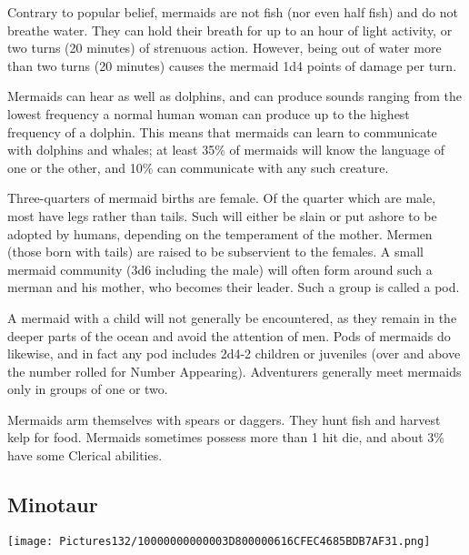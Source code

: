 \documentclass[a4paper,twoside,openany,10pt]{book}
\begin{document}
\begin{multicols}{2}
Contrary to popular belief, mermaids are not fish (nor even half fish) and do not breathe water. They can hold their breath for up to an hour of light activity, or two turns (20 minutes) of strenuous action. However, being out of water more than two turns (20 minutes) causes the mermaid 1d4 points of damage per turn.

Mermaids can hear as well as dolphins, and can produce sounds ranging from the lowest frequency a normal human woman can produce up to the highest frequency of a dolphin. This means that mermaids can learn to communicate with dolphins and whales; at least 35\% of mermaids will know the language of one or the other, and 10\% can communicate with any such creature.

Three-quarters of mermaid births are female. Of the quarter which are male, most have legs rather than tails. Such will either be slain or put ashore to be adopted by humans, depending on the temperament of the mother. Mermen (those born with tails) are raised to be subservient to the females. A small mermaid community (3d6 including the male) will often form around such a merman and his mother, who becomes their leader. Such a group is called a pod.

A mermaid with a child will not generally be encountered, as they remain in the deeper parts of the ocean and avoid the attention of men. Pods of mermaids do likewise, and in fact any pod includes 2d4-2 children or juveniles (over and above the number rolled for Number Appearing). Adventurers generally meet mermaids only in groups of one or two.

Mermaids arm themselves with spears or daggers. They hunt fish and harvest kelp for food. Mermaids sometimes possess more than 1 hit die, and about 3\% have some Clerical abilities.

\subsection*{Minotaur}\label{minotaur}


\begin{center} \texttt{[image: Pictures132/10000000000003D800000616CFEC4685BDB7AF31.png]} \end{center}


\end{multicols}
\end{document}
